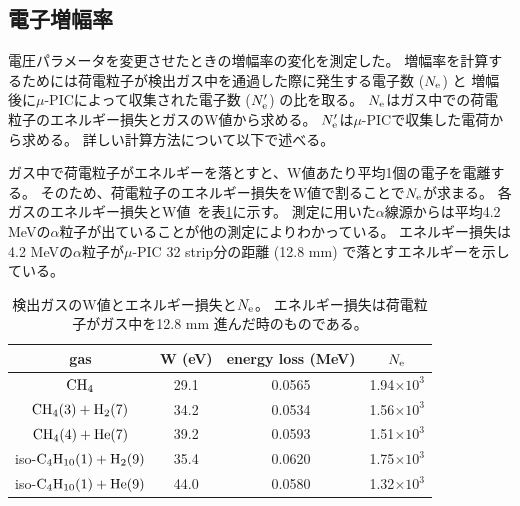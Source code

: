 \subsection{電子増幅率}
電圧パラメータを変更させたときの増幅率の変化を測定した。
増幅率を計算するためには荷電粒子が検出ガス中を通過した際に発生する電子数 ($N_{\rm e}$) と
増幅後に$\mu$-PICによって収集された電子数 ($N'_{\rm e}$) の比を取る。
$N_{\rm e}$はガス中での荷電粒子のエネルギー損失とガスのW値から求める。
$N'_{\rm e}$は$\mu$-PICで収集した電荷から求める。
詳しい計算方法について以下で述べる。

ガス中で荷電粒子がエネルギーを落とすと、W値あたり平均1個の電子を電離する。
そのため、荷電粒子のエネルギー損失をW値で割ることで$N_{\rm e}$が求まる。
各ガスのエネルギー損失とW値~\cite{energy_per_ion_pair,pdg}を表\ref{tab::energy_loss_and_W_val}に示す。
測定に用いた$\alpha$線源からは平均4.2 MeVの$\alpha$粒子が出ていることが他の測定によりわかっている。
エネルギー損失は4.2 MeVの$\alpha$粒子が$\mu$-PIC 32 strip分の距離 (12.8 mm) で落とすエネルギーを示している。
\begin{table}
  \centering
  \caption[検出ガスのW値とエネルギー損失と$N_{\rm e}$。]
          {検出ガスのW値とエネルギー損失と$N_{\rm e}$。
          エネルギー損失は荷電粒子がガス中を12.8 mm 進んだ時のものである。}
  \label{tab::energy_loss_and_W_val}
  \begin{tabular}{cccc}
    \toprule
    gas & W (eV) & energy loss (MeV) & $N_{\rm e}$\\
    \midrule
    ${\rm CH_{4}}$                          & 29.1 & 0.0565 & 1.94$\times 10^{3}$ \\
    ${\rm CH_{4} (3) + H_{2} (7)}$          & 34.2 & 0.0534 & 1.56$\times 10^{3}$ \\
    ${\rm CH_{4} (4) + He (7)}$             & 39.2 & 0.0593 & 1.51$\times 10^{3}$ \\
    iso-${\rm C_{4}H_{10} (1) + H_{2} (9)}$ & 35.4 & 0.0620 & 1.75$\times 10^{3}$ \\
    iso-${\rm C_{4}H_{10} (1) + He (9)}$    & 44.0 & 0.0580 & 1.32$\times 10^{3}$ \\
    \bottomrule
  \end{tabular}
\end{table}

